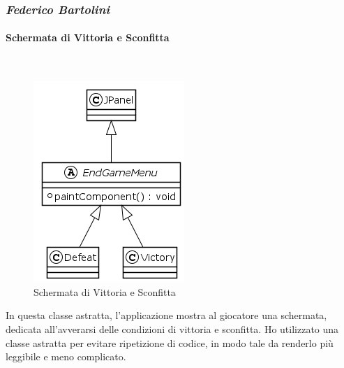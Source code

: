 \documentclass[a4paper,titlepage,12pt]{article}
\begin{document}
\subsubsection*{\large \slshape Federico Bartolini}
\paragraph{Schermata di Vittoria e Sconfitta}
\par \noindent \\
\begin{figure}[H]
    \centering
    \includegraphics[scale=0.8]{img/uml/EndGameMenu.png}
    \caption{Schermata di Vittoria e Sconfitta}
    \label{fig: Schermata di Vittoria e Sconfitta}
\end{figure}
\par \noindent In questa classe astratta, l’applicazione mostra al giocatore una schermata, dedicata all’avverarsi delle condizioni di vittoria e sconfitta. Ho utilizzato una classe astratta per evitare ripetizione di codice, in modo tale da renderlo più leggibile e meno complicato.
\end{document}
